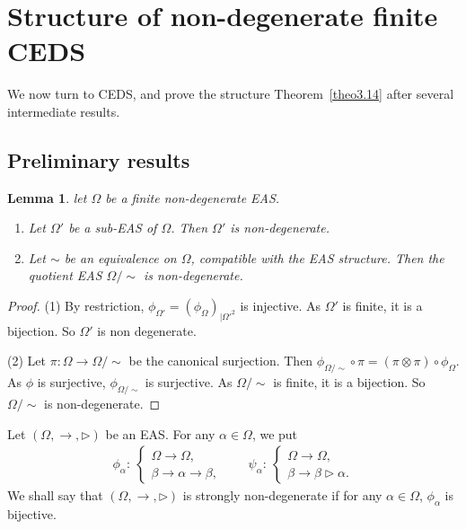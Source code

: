\documentclass[10pt,a4paper]{amsart}
\numberwithin{equation}{section}
\newtheorem{Lemma}[Theorem]{Lemma}
\begin{document}
\section{Structure of non-degenerate finite CEDS}

We now turn to CEDS, and prove the structure Theorem~\ref{theo3.14} after several intermediate results.

\subsection{Preliminary results}

\begin{Lemma}\label{lem3.1}
let $\Omega$ be a finite non-degenerate EAS.
\begin{enumerate}\itemsep=0pt
\item[$(1)$] Let $\Omega'$ be a sub-EAS of $\Omega$. Then $\Omega'$ is non-degenerate.
\item[$(2)$] Let $\sim$ be an equivalence on $\Omega$, compatible with the EAS structure. Then the quotient EAS $\Omega/{\sim}$ is non-degenerate.
\end{enumerate}
\end{Lemma}

\begin{proof}
(1) By restriction, $\phi_{\Omega'}=(\phi_\Omega)_{\mid \Omega'^2}$ is injective. As $\Omega'$ is finite, it is a bijection. So $\Omega'$ is non degenerate.

(2) Let $\pi\colon\Omega\longrightarrow \Omega/{\sim}$ be the canonical surjection. Then $\phi_{\Omega/{\sim}}\circ \pi=(\pi\otimes \pi)\circ \phi_\Omega$. As $\phi$ is surjective, $\phi_{\Omega/{\sim}}$ is surjective.
As $\Omega/{\sim}$ is finite, it is a bijection. So $\Omega/{\sim}$ is non-degenerate.
 \end{proof}

\begin{Definition}
Let $(\Omega,\rightarrow,\triangleright)$ be an EAS. For any $\alpha \in \Omega$, we put
\begin{align*}
\phi_\alpha\colon\ \begin{cases}
\Omega \longrightarrow \Omega,\\
\beta \longrightarrow \alpha\rightarrow \beta,
\end{cases}\qquad
\psi_\alpha\colon\ \begin{cases}
\Omega \longrightarrow \Omega,\\
\beta \longrightarrow \beta\triangleright\alpha.
\end{cases}
\end{align*}
We shall say that $(\Omega,\rightarrow,\triangleright)$ is strongly non-degenerate if for any $\alpha\in \Omega$, $\phi_\alpha$ is bijective.
\end{Definition}
\end{document}
